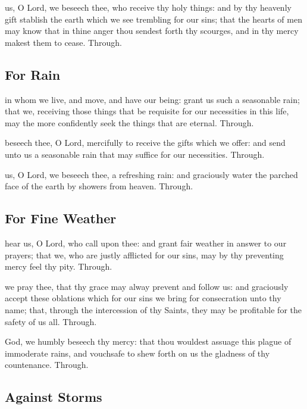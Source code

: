 \begin{multicols}{2}
\postcommunion
{} us, O Lord, we beseech thee, who receive thy holy things: and by thy heavenly gift stablish the earth which we see trembling for our sins; that the hearts of men may know that in thine anger thou sendest forth thy scourges, and in thy mercy makest them to cease. Through.

   \newcolumn

\subsection{For Rain}
\collect
{} in whom we live, and move, and have our being: grant us such a seasonable rain; that we, receiving those things that be requisite for our necessities in this life, may the more confidently seek the things that are eternal. Through.

\secret
{} beseech thee, O Lord, mercifully to receive the gifts which we offer: and send unto us a seasonable rain that may suffice for our necessities. Through.

\postcommunion
{} us, O Lord, we beseech thee, a refreshing rain: and graciously water the parched face of the earth by showers from heaven. Through.

\subsection{For Fine Weather}

\collect
{} hear us, O Lord, who call upon thee: and grant fair weather in answer to our prayers; that we, who are justly afflicted for our sins, may by thy preventing mercy feel thy pity. Through.

   \newcolumn

\secret
{} we pray thee, that thy grace may alway prevent and follow us: and graciously accept these oblations which for our sins we bring for consecration unto thy name; that, through the intercession of thy Saints, they may be profitable for the safety of us all. Through.

\postcommunion
{} God, we humbly beseech thy mercy: that thou wouldest assuage this plague of immoderate rains, and vouchsafe to shew forth on us the gladness of thy countenance. Through.


\subsection{Against Storms}


\end{multicols}
